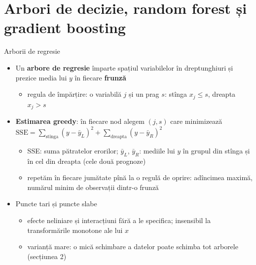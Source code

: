 \section{Arbori de decizie, random forest și gradient boosting}

\begin{frame}{Arborii de regresie}
\itemsize{\small}
\begin{itemize}
    \item Un \textbf{arbore de regresie} împarte spațiul variabilelor în dreptunghiuri și prezice media lui $y$ în fiecare \textbf{frunză}
    \begin{itemize}
        \item regula de împărțire: o variabilă $j$ și un prag $s$: stînga $x_j \le s$, dreapta $x_j > s$
    \end{itemize}
    \item \textbf{Estimarea greedy}: în fiecare nod alegem $(j, s)$ care minimizează $\mathrm{SSE} = \sum_{\text{stînga}}(y - \bar y_L)^2 + \sum_{\text{dreapta}}(y - \bar y_R)^2$
    \begin{itemize}
        \item SSE: suma pătratelor erorilor; $\bar y_L$, $\bar y_R$: mediile lui $y$ în grupul din stînga și în cel din dreapta (cele două prognoze)
        \item repetăm în fiecare jumătate pînă la o regulă de oprire: adîncimea maximă, numărul minim de observații dintr-o frunză
    \end{itemize}
    \item Puncte tari și puncte slabe
    \begin{itemize}
        \item efecte neliniare și interacțiuni fără a le specifica; insensibil la transformările monotone ale lui $x$
        \item varianță mare: o mică schimbare a datelor poate schimba tot arborele (secțiunea 2)
    \end{itemize}
\end{itemize}
\end{frame}

